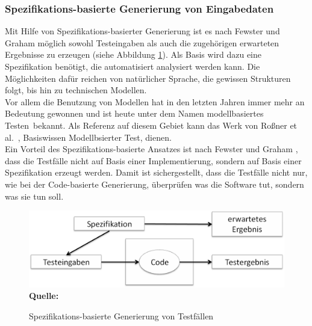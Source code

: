 \subsubsection{Spezifikations-basierte Generierung von Eingabedaten}
\label{subsubsec:spezifikationsbasierte_generierung}
Mit Hilfe von Spezifikations-basierter Generierung ist es nach Fewster und Graham \cite[vgl. S. 21]{fewster_software_1999} möglich sowohl Testeingaben als auch die zugehörigen erwarteten Ergebnisse zu erzeugen (siehe Abbildung \ref{fig:specBasedDesign}). Als Basis wird dazu eine Spezifikation benötigt, die automatisiert analysiert werden kann. Die Möglichkeiten dafür reichen von natürlicher Sprache, die gewissen Strukturen folgt, bis hin zu technischen Modellen.\\ Vor allem die Benutzung von Modellen hat in den letzten Jahren immer mehr an Bedeutung gewonnen und ist heute unter dem Namen \grq modellbasiertes Testen\grq\ bekannt. Als Referenz auf diesem Gebiet kann das Werk von Roßner et al.\ \cite{rossner_basiswissen_2010}, \glqq Basiswissen Modellbsierter Test\grqq, dienen.\\
Ein Vorteil des Spezifikations-basierte Ansatzes ist nach Fewster und Graham \cite[vgl. S. 21]{fewster_software_1999}, dass die Testfälle nicht auf Basis einer Implementierung, sondern auf Basis einer Spezifikation erzeugt werden. Damit ist sichergestellt, dass die Testfälle nicht nur, wie bei der Code-basierte Generierung, überprüfen \grq was die Software tut\grq , sondern \grq was sie tun soll\grq.

\begin{figure}[htb]
  \centering  
  \includegraphics[scale=0.6]{img/specBasedDesign.png}\\
  \footnotesize\sffamily\textbf{Quelle:} \cite[vgl. S. 21]{fewster_software_1999}
  \caption{Spezifikations-basierte Generierung von Testfällen}
  \label{fig:specBasedDesign}
\end{figure}

